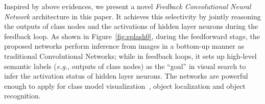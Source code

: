 Inspired by above evidences, we present a novel \emph{Feedback Convolutional Neural Network} architecture in this paper. It achieves this selectivity by jointly reasoning the outputs of class nodes and the activations of hidden layer neurons during the feedback loop. As shown in Figure~\ref{fig:splash0}, during the feedforward stage, the proposed networks perform inference from images in a bottom-up manner as traditional Convolutional Networks; while in feedback loops, it sets up high-level semantic labels (\emph{e.g.}, outputs of class nodes) as the ``goal'' in visual search to infer the activation status of hidden layer neurons. The networks are powerful enough to apply for class model visualization~\cite{simonyan2013deep, zeiler2014visualizing}, object localization and object recognition.

\setlength{\tabcolsep}{0.5pt}
